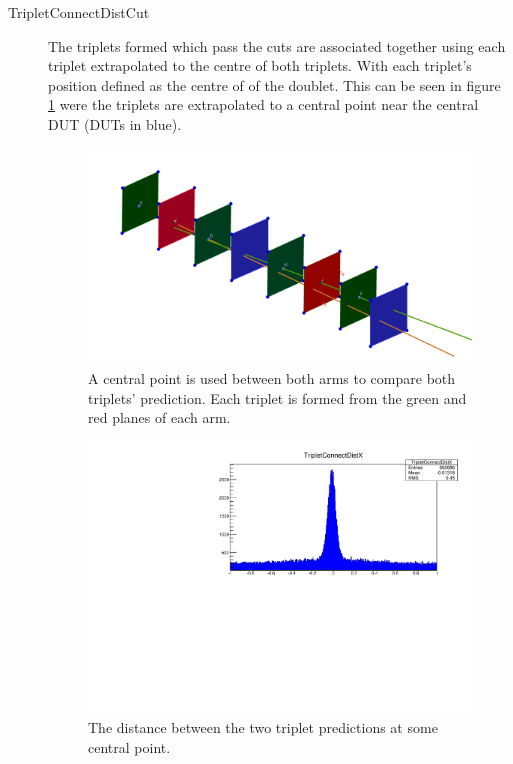 \begin{description}
\item[TripletConnectDistCut]  The triplets formed which pass the cuts are associated together using each triplet extrapolated to the centre of both triplets. With each triplet's position defined as the centre of of the doublet. This can be seen in figure \ref{fig:TripCon} were the triplets are extrapolated to a central point near the central DUT (DUTs in blue).

\begin{figure}[H]
\centering
\includegraphics[width=1.0\linewidth]{figures/tripletsconnect.png}
\caption{A central point is used between both arms to compare both triplets' prediction. Each triplet is formed from the green and red planes of each arm. }
\label{fig:TripCon}
\end{figure}

\begin{figure}[H]
\centering
\includegraphics[width=1.0\linewidth]{figures/TripletConnectDistX-442.pdf}
\caption{The distance between the two triplet predictions at some central point.}
\label{fig:TripCen}
\end{figure}


\end{description}
